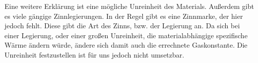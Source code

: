 Eine weitere Erklärung ist eine mögliche Unreinheit des Materials. Außerdem gibt es viele gängige Zinnlegierungen.
In der Regel gibt es eine Zinnmarke, der hier jedoch fehlt. Diese gibt die Art des Zinns, bzw. der Legierung an.
Da sich bei einer Legierung, oder einer großen Unreinheit, die materialabhängige spezifische Wärme ändern würde, ändere sich damit auch 
die errechnete Gaskonstante. Die Unreinheit festzustellen ist für uns jedoch nicht umsetzbar.